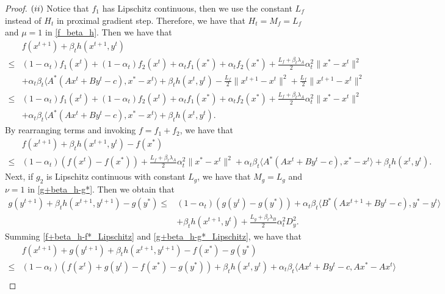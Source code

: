 \documentclass{article}
\numberwithin{equation}{section}
\begin{document}
\begin{proof}
    $(\romannumeral2)$ 
    Notice that  $f_1$ has Lipschitz continuous, then we use the constant $L_f$ instead of $H_t$ in proximal 
    gradient step. Therefore,  we have that $H_t = M_f =L_f$ and $\mu=1$ in \eqref{f_beta_h}. Then we have that  
    \begin{align}
        &f(x^{t+1}) +\beta_th(x^{t+1},y^t) \nonumber \\
        \leq & (1-\alpha_t)f_1(x^t)+(1-\alpha_t)f_2(x^t) +\alpha_t f_1(x^*)+\alpha_tf_2(x^*)+\frac{L_f+\beta_t\lambda_A}{2}\alpha_t^2\|x^*-x^t\rVert^2 \nonumber \\
        &+\alpha_t\beta_t\langle A^*(Ax^t+By^t-c), x^*-x^t\rangle + \beta_th(x^t,y^t) -\frac{L_f}{2}\|x^{t+1}-x^t\rVert^2 +\frac{L_f}{2}\|x^{t+1}-x^t\rVert^{2}  \nonumber \\
        \leq & (1-\alpha_t)f_1(x^t)+(1-\alpha_t)f_2(x^t) +\alpha_t f_1(x^*)+\alpha_tf_2(x^*)+\frac{L_f+\beta_t\lambda_A}{2}\alpha_t^2\|x^*-x^t\rVert^2 \nonumber \\
        &+\alpha_t\beta_t\langle A^*(Ax^t+By^t-c), x^*-x^t\rangle + \beta_th(x^t,y^t). \nonumber 
    \end{align}
    By rearranging terms and invoking $f=f_1+f_2$, we have that 
    \begin{align}
        &f(x^{t+1}) +\beta_th(x^{t+1},y^t) -f(x^*) \nonumber \\
        \leq & (1-\alpha_t)(f(x^t)-f(x^*)) +\frac{L_f+\beta_t\lambda_A}{2}\alpha_t^2\|x^*-x^t\rVert^2 
        +\alpha_t\beta_t\langle A^*(Ax^t+By^t-c), x^*-x^t\rangle + \beta_th(x^t,y^t). \label{f+beta_h-f*_Lipschitz}
    \end{align}
    Next, if $g_2$ is Lipschitz continuous with constant $L_g$, we have that $M_g = L_g$ and $\nu=1$ in 
    \eqref{g+beta_h-g*}. Then we obtain that 
    \begin{align}\label{g+beta_h-g*_Lipschitz}
        g(y^{t+1}) + \beta_th(x^{t+1},y^{t+1}) - g(y^*) 
        \leq& (1-\alpha_t)(g(y^t)-g(y^*))+ \alpha_t\beta_t\langle B^*(Ax^{t+1}+By^t-c), y^*-y^t\rangle   \nonumber \\
        &+ \beta_th(x^{t+1},y^t)+ 
        \frac{L_g+\beta_t\lambda_B}{2}\alpha_t^{2}D_y^{2}.      
    \end{align}      
    Summing \eqref{f+beta_h-f*_Lipschitz} and \eqref{g+beta_h-g*_Lipschitz}, we have that 
    \begin{align}
        &f(x^{t+1}) +g(y^{t+1}) +\beta_{t}h(x^{t+1},y^{t+1}) -f(x^*) -g(y^*) \nonumber \\
        \leq& (1-\alpha_t)\left(f(x^t) +g(y^t) -f(x^*)-g(y^*)\right) +\beta_{t}h(x^t,y^t)+\alpha_t\beta_{t}\langle Ax^t+By^t-c,Ax^*-Ax^t\rangle \nonumber \\

\end{align}
\end{proof}
\end{document}
